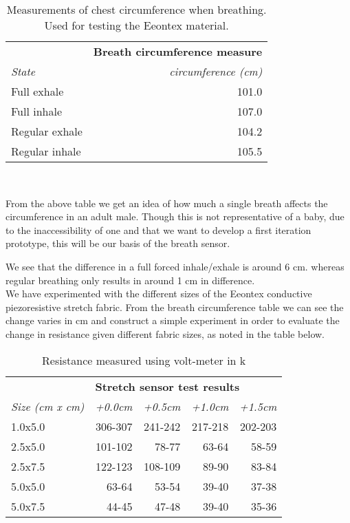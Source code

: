 \documentclass{sigchi-ext}
\begin{document}
\begin{table}[H]
  \centering
  \begin{tabular}{l r}
    & \multicolumn{1}{l}{\small{\textbf{Breath circumference measure}}} \\
    \cmidrule(r){1-2}
    {\small\textit{State}}
    & {\small \textit{circumference (cm)}} \\
    \midrule
    Full exhale    & 101.0 \\
    Full inhale    & 107.0 \\
    Regular exhale & 104.2 \\
    Regular inhale & 105.5  \\
  \end{tabular}
  \caption{Measurements of chest circumference when breathing. Used for testing the Eeontex material.}~\label{tab:circumference}
\end{table}
From the above table we get an idea of how much a single breath affects the circumference
in an adult male. Though this is not representative of a baby, due to the 
inaccessibility of one and that we want to develop a first iteration prototype, this
will be our basis of the breath sensor.

We see that the difference in a full forced inhale/exhale is around 6 cm. whereas regular
breathing only results in around 1 cm in difference.\\
We have experimented with the different sizes of the Eeontex conductive piezoresistive 
stretch fabric. From the breath circumference table we can see the change varies in cm and construct a simple experiment in order to evaluate the change in resistance given 
different fabric sizes, as noted in the table below.


\begin{table}[H]
  \centering
  \begin{tabular}{l r r r r}
    & \multicolumn{4}{l}{\small{\textbf{Stretch sensor test results}}} \\
    \cmidrule(r){1-2}
    {\small\textit{Size (cm x cm)}}
    & {\small \textit{+0.0cm}} 
    & {\small \textit{+0.5cm}} 
    & {\small \textit{+1.0cm}} 
    & {\small \textit{+1.5cm}} \\
    \midrule
    1.0x5.0    & 306-307 & 241-242 & 217-218 & 202-203\\
    2.5x5.0    & 101-102 & 78-77 & 63-64 & 58-59 \\
    2.5x7.5    & 122-123 & 108-109 & 89-90 & 83-84 \\
    5.0x5.0    & 63-64 & 53-54 & 39-40 & 37-38 \\
    5.0x7.5    & 44-45 & 47-48 & 39-40 & 35-36 \\
  \end{tabular}
  \caption{Resistance measured using volt-meter in k\ohm}~\label{tab:stretch-test}
\end{table}
\end{document}
